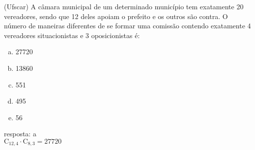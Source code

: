 \begin{ex}
 (Ufscar) A câmara municipal de um determinado município tem exatamente 20 vereadores, sendo que 12 deles apoiam o prefeito e os outros são contra. O número de maneiras diferentes de se formar uma comissão contendo exatamente 4 vereadores situacionistas  e 3 oposicionistas é:
    \begin{enumerate}[(a)]
    \item 27720
    \item 13860
    \item 551
    \item 495
    \item 56
    \end{enumerate}
      \begin{sol}
       resposta: a\\
       $\mathrm{C}_{{12},4}\cdot\mathrm{C}_{8,3}=27720$
      \end{sol}
\end{ex}